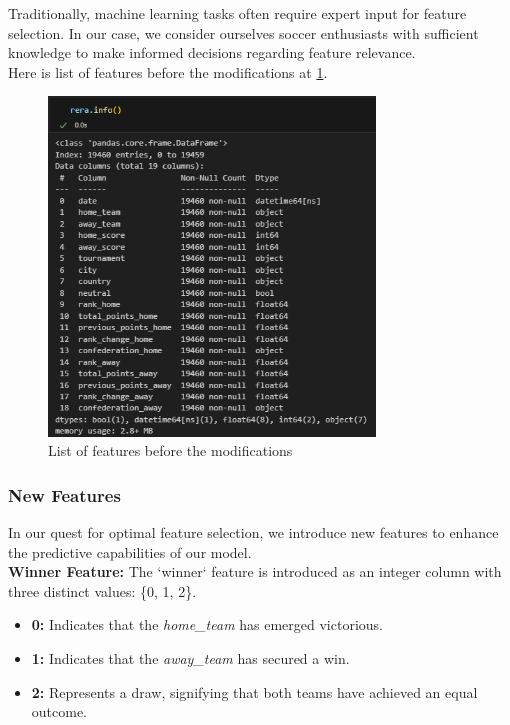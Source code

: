 \documentclass[a4paper,12pt]{article}
\begin{document}
Traditionally, machine learning tasks often require expert input for feature selection. In our case, we consider ourselves soccer enthusiasts with sufficient knowledge to make informed decisions regarding feature relevance.\\

Here is list of features before the modifications at \ref{fig:features_b4_modifications}.

\begin{figure}
  \centering
  \includegraphics[height=9cm]{./images/features_b4_modifications.png}
  \caption{List of features before the modifications}
  \label{fig:features_b4_modifications}
\end{figure}

\subsubsection{New Features}

In our quest for optimal feature selection, we introduce new features to enhance the predictive capabilities of our model.\\

\textbf{Winner Feature:}
The `winner` feature is introduced as an integer column with three distinct values: \{0, 1, 2\}.
\begin{itemize}
    \item \textbf{0:} Indicates that the {\it home\_team} has emerged victorious.
    \item \textbf{1:} Indicates that the {\it away\_team} has secured a win.
    \item \textbf{2:} Represents a draw, signifying that both teams have achieved an equal outcome.\\
\end{itemize}
\end{document}
